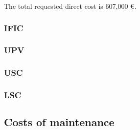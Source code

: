 The total requested direct cost is 607,000 \euro. 


\subsubsection{IFIC}



\subsubsection{UPV}

\subsubsection{USC}


\subsubsection{LSC}



\subsection{Costs of maintenance}

 
 